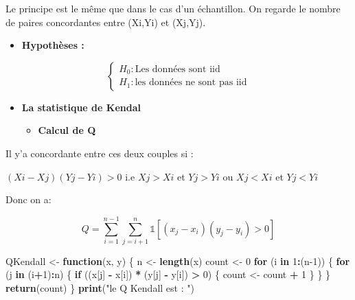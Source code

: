 \documentclass[
  12pt,
]{article}
\newenvironment{Shaded}{\begin{snugshade}}{\end{snugshade}}
\newcommand{\ControlFlowTok}[1]{\textcolor[rgb]{0.13,0.29,0.53}{\textbf{#1}}}
\newcommand{\DecValTok}[1]{\textcolor[rgb]{0.00,0.00,0.81}{#1}}
\newcommand{\FunctionTok}[1]{\textcolor[rgb]{0.13,0.29,0.53}{\textbf{#1}}}
\newcommand{\NormalTok}[1]{#1}
\newcommand{\OtherTok}[1]{\textcolor[rgb]{0.56,0.35,0.01}{#1}}
\newcommand{\SpecialCharTok}[1]{\textcolor[rgb]{0.81,0.36,0.00}{\textbf{#1}}}
\newcommand{\StringTok}[1]{\textcolor[rgb]{0.31,0.60,0.02}{#1}}
\providecommand{\tightlist}{%
  \setlength{\itemsep}{0pt}\setlength{\parskip}{0pt}}
\begin{document}
Le principe est le même que dans le cas d'un échantillon. On regarde le
nombre de paires concordantes entre (Xi,Yi) et (Xj,Yj).

\begin{itemize}
\tightlist
\item
  \textbf{Hypothèses :}
\end{itemize}

\[
\begin{cases} 
H_0 : \text{Les données sont iid} \\ 
H_1 : \text{les données ne sont pas iid}
\end{cases}
\]

\begin{itemize}
\item
  \textbf{La statistique de Kendal}

  \begin{itemize}
  \tightlist
  \item
    \textbf{Calcul de Q}
  \end{itemize}
\end{itemize}

Il y'a concordante entre ces deux couples si :

\((Xi −Xj)(Yj −Yi) > 0\) i.e \(Xj > Xi\) et \(Yj > Yi\) ou \(Xj < Xi\)
et \(Yj < Yi\)

Donc on a:

\[
Q = \sum_{i=1}^{n-1} \sum_{j=i+1}^{n} \mathbb{1}\left[(x_j - x_i)(y_j - y_i) > 0\right]
\]

\begin{Shaded}
\begin{Highlighting}[]
\NormalTok{QKendall }\OtherTok{\textless{}{-}} \ControlFlowTok{function}\NormalTok{(x, y) \{}
\NormalTok{  n }\OtherTok{\textless{}{-}} \FunctionTok{length}\NormalTok{(x)}
\NormalTok{  count }\OtherTok{\textless{}{-}} \DecValTok{0}
  \ControlFlowTok{for}\NormalTok{ (i }\ControlFlowTok{in} \DecValTok{1}\SpecialCharTok{:}\NormalTok{(n}\DecValTok{{-}1}\NormalTok{)) \{}
    \ControlFlowTok{for}\NormalTok{ (j }\ControlFlowTok{in}\NormalTok{ (i}\SpecialCharTok{+}\DecValTok{1}\NormalTok{)}\SpecialCharTok{:}\NormalTok{n) \{}
      \ControlFlowTok{if}\NormalTok{ ((x[j] }\SpecialCharTok{{-}}\NormalTok{ x[i]) }\SpecialCharTok{*}\NormalTok{ (y[j] }\SpecialCharTok{{-}}\NormalTok{ y[i]) }\SpecialCharTok{\textgreater{}} \DecValTok{0}\NormalTok{) \{}
\NormalTok{        count }\OtherTok{\textless{}{-}}\NormalTok{ count }\SpecialCharTok{+} \DecValTok{1}
\NormalTok{      \}}
\NormalTok{    \}}
\NormalTok{  \}}
  \FunctionTok{return}\NormalTok{(count)}
\NormalTok{\}}
\FunctionTok{print}\NormalTok{(}\StringTok{"le Q Kendall est : "}\NormalTok{)}
\end{Highlighting}
\end{Shaded}
\end{document}
